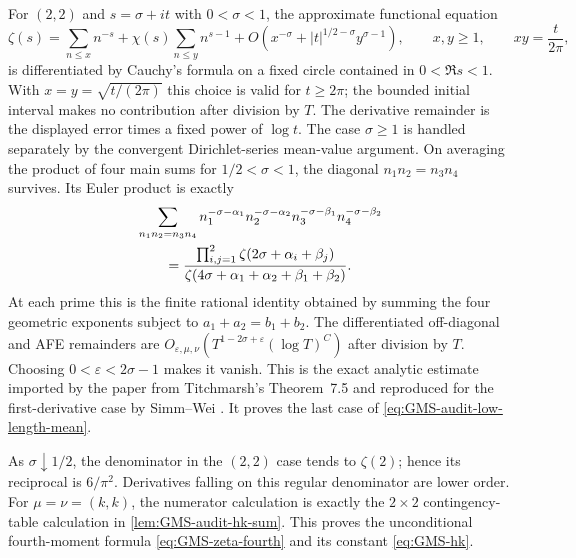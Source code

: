 For $(2,2)$ and $s=\sigma+it$ with $0<\sigma<1$, the approximate functional equation
\begin{equation}
 \zeta(s)=\sum_{n\leq x}n^{-s}
 +\chi(s)\sum_{n\leq y}n^{s-1}
 +O\!\left(x^{-\sigma}+|t|^{1/2-\sigma}y^{\sigma-1}\right),
 \qquad x,y\geq1,\qquad xy=\frac{t}{2\pi},
 \label{eq:GMS-audit-AFE}
\end{equation}
is differentiated by Cauchy's formula on a fixed circle contained in $0<\Re s<1$.  With
$x=y=\sqrt{t/(2\pi)}$ this choice is valid for $t\geq2\pi$; the bounded initial interval makes
no contribution after division by $T$.  The derivative remainder is the displayed error times
a fixed power of $\log t$.  The case $\sigma\geq1$ is handled separately by the convergent
Dirichlet-series mean-value argument.  On averaging the product of four main sums for
$1/2<\sigma<1$, the diagonal $n_1n_2=n_3n_4$ survives.  Its Euler product is exactly
\begin{align}
 &\sum_{n_1n_2=n_3n_4}
 n_1^{-\sigma-\alpha_1}n_2^{-\sigma-\alpha_2}
 n_3^{-\sigma-\beta_1}n_4^{-\sigma-\beta_2}\notag\\
 &\qquad=
 \frac{\prod_{i,j=1}^{2}\zeta(2\sigma+\alpha_i+\beta_j)}
 {\zeta(4\sigma+\alpha_1+\alpha_2+\beta_1+\beta_2)}.
 \label{eq:GMS-audit-fourfold-Euler-identity}
\end{align}
At each prime this is the finite rational identity obtained by summing the four geometric
exponents subject to $a_1+a_2=b_1+b_2$.  The differentiated off-diagonal and AFE remainders
are
$O_{\varepsilon,\mu,\nu}(T^{1-2\sigma+\varepsilon}(\log T)^C)$ after division by $T$.  Choosing
$0<\varepsilon<2\sigma-1$ makes it vanish.  This is the exact analytic estimate imported by the paper from
Titchmarsh's Theorem~7.5 and reproduced for the first-derivative case by Simm--Wei
\cite[Sec.~3, Lemma~3.1]{simmWei2026}.  It proves the last case of
\eqref{eq:GMS-audit-low-length-mean}.

As $\sigma\downarrow1/2$, the denominator in the $(2,2)$ case tends to
$\zeta(2)$; hence its reciprocal is $6/\pi^2$.  Derivatives falling on this regular denominator
are lower order.  For $\mu=\nu=(k,k)$, the numerator calculation is exactly the $2\times2$
contingency-table calculation in \cref{lem:GMS-audit-hk-sum}.  This proves the unconditional
fourth-moment formula \eqref{eq:GMS-zeta-fourth} and its constant \eqref{eq:GMS-hk}.

